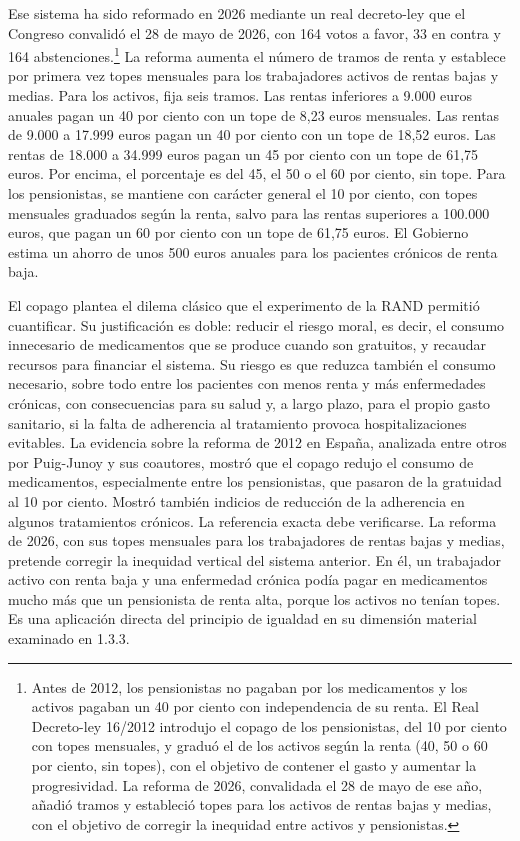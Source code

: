 \documentclass[10pt,a4paper]{article}
\begin{document}
Ese sistema ha sido reformado en 2026 mediante un real decreto-ley que el Congreso convalidó el 28 de mayo de 2026, con 164 votos a favor, 33 en contra y 164 abstenciones.\footnote{%
    Antes de 2012, los pensionistas no pagaban por los medicamentos y los activos pagaban un 40 por ciento con independencia de su renta. El Real Decreto-ley 16/2012 introdujo el copago de los pensionistas, del 10 por ciento con topes mensuales, y graduó el de los activos según la renta (40, 50 o 60 por ciento, sin topes), con el objetivo de contener el gasto y aumentar la progresividad. La reforma de 2026, convalidada el 28 de mayo de ese año, añadió tramos y estableció topes para los activos de rentas bajas y medias, con el objetivo de corregir la inequidad entre activos y pensionistas.
} La reforma aumenta el número de tramos de renta y establece por primera vez topes mensuales para los trabajadores activos de rentas bajas y medias. Para los activos, fija seis tramos. Las rentas inferiores a 9.000 euros anuales pagan un 40 por ciento con un tope de 8,23 euros mensuales. Las rentas de 9.000 a 17.999 euros pagan un 40 por ciento con un tope de 18,52 euros. Las rentas de 18.000 a 34.999 euros pagan un 45 por ciento con un tope de 61,75 euros. Por encima, el porcentaje es del 45, el 50 o el 60 por ciento, sin tope. Para los pensionistas, se mantiene con carácter general el 10 por ciento, con topes mensuales graduados según la renta, salvo para las rentas superiores a 100.000 euros, que pagan un 60 por ciento con un tope de 61,75 euros. El Gobierno estima un ahorro de unos 500 euros anuales para los pacientes crónicos de renta baja.

El copago plantea el dilema clásico que el experimento de la RAND permitió cuantificar. Su justificación es doble: reducir el riesgo moral, es decir, el consumo innecesario de medicamentos que se produce cuando son gratuitos, y recaudar recursos para financiar el sistema. Su riesgo es que reduzca también el consumo necesario, sobre todo entre los pacientes con menos renta y más enfermedades crónicas, con consecuencias para su salud y, a largo plazo, para el propio gasto sanitario, si la falta de adherencia al tratamiento provoca hospitalizaciones evitables. La evidencia sobre la reforma de 2012 en España, analizada entre otros por Puig-Junoy y sus coautores, mostró que el copago redujo el consumo de medicamentos, especialmente entre los pensionistas, que pasaron de la gratuidad al 10 por ciento. Mostró también indicios de reducción de la adherencia en algunos tratamientos crónicos. La referencia exacta debe verificarse. La reforma de 2026, con sus topes mensuales para los trabajadores de rentas bajas y medias, pretende corregir la inequidad vertical del sistema anterior. En él, un trabajador activo con renta baja y una enfermedad crónica podía pagar en medicamentos mucho más que un pensionista de renta alta, porque los activos no tenían topes. Es una aplicación directa del principio de igualdad en su dimensión material examinado en 1.3.3.
\end{document}
